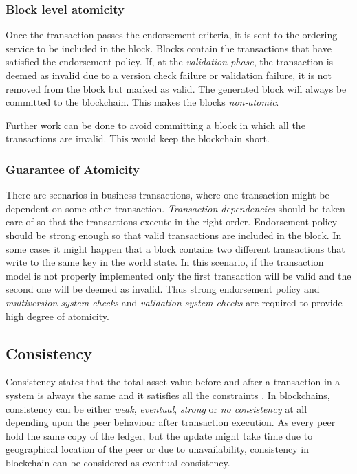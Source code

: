 \documentclass[
  a4paper,  %
  twoside,  %
  bibliography=totoc,
  headsepline,
  cleardoublepage=empty,
  parskip=half,
  draft=false
]{scrbook}
\begin{document}
\subsubsection{Block level atomicity}
Once the transaction passes the endorsement criteria, it is sent to the ordering service to be included in the block. Blocks contain the transactions that have satisfied the endorsement policy. If, at the \textit{validation phase}, the transaction is deemed as invalid due to a version check failure or validation failure, it is not removed from the block but marked as valid. The generated block will always be committed to the blockchain. This makes the blocks \textit{non-atomic}.

Further work can be done to avoid committing a block in which all the transactions are invalid. This would keep the blockchain short.

\subsubsection{Guarantee of Atomicity}
There are scenarios in business transactions, where one transaction might be dependent on some other transaction. \textit{Transaction dependencies} should be taken care of so that the transactions execute in the right order. Endorsement policy should be strong enough so that valid transactions are included in the block. In some cases it might happen that a block contains two different transactions that write to the same key in the world state. In this scenario, if the transaction model is not properly implemented only the first transaction will be valid and the second one will be deemed as invalid. Thus strong endorsement policy and \textit{multiversion system checks} and \textit{validation system checks} are required to provide high degree of atomicity.


\subsection{Consistency}
Consistency states that the total asset value before and after a transaction in a system is always the same and it satisfies all the constraints \cite{Atomicity}. In blockchains, consistency can be either \textit{weak}, \textit{eventual}, \textit{strong} or \textit{no consistency} at all depending upon the peer behaviour after transaction execution. As every peer hold the same copy of the ledger, but the update might take time due to geographical location of the peer or due to unavailability, consistency in blockchain can be considered as eventual consistency.
\end{document}
